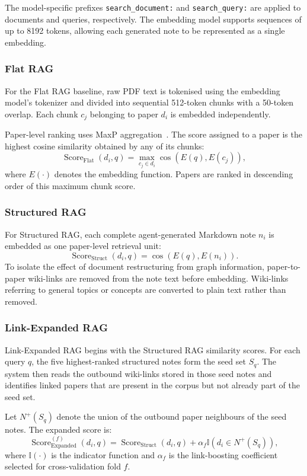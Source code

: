 \documentclass[runningheads]{llncs}
\begin{document}
The model-specific prefixes \texttt{search\_document:} and \texttt{search\_query:} are applied to documents and queries, respectively. The embedding model supports sequences of up to 8192 tokens, allowing each generated note to be represented as a single embedding.

\subsubsection{Flat RAG}
For the Flat RAG baseline, raw PDF text is tokenised using the embedding model's tokenizer and divided into sequential 512-token chunks with a 50-token overlap. Each chunk \(c_j\) belonging to paper \(d_i\) is embedded independently.

Paper-level ranking uses MaxP aggregation~\cite{dai2019deeper}. The score assigned to a paper is the highest cosine similarity obtained by any of its chunks:
\[
\operatorname{Score}_{\mathrm{Flat}}(d_i,q)
=
\max_{c_j \in d_i}
\cos\left(E(q),E(c_j)\right),
\]
where \(E(\cdot)\) denotes the embedding function. Papers are ranked in descending order of this maximum chunk score.

\subsubsection{Structured RAG}
For Structured RAG, each complete agent-generated Markdown note \(n_i\) is embedded as one paper-level retrieval unit:
\[
\operatorname{Score}_{\mathrm{Struct}}(d_i,q)
=
\cos\left(E(q),E(n_i)\right).
\]
To isolate the effect of document restructuring from graph information, paper-to-paper wiki-links are removed from the note text before embedding. Wiki-links referring to general topics or concepts are converted to plain text rather than removed.

\subsubsection{Link-Expanded RAG}
Link-Expanded RAG begins with the Structured RAG similarity scores. For each query \(q\), the five highest-ranked structured notes form the seed set \(S_q\). The system then reads the outbound wiki-links stored in those seed notes and identifies linked papers that are present in the corpus but not already part of the seed set.

Let \(N^{+}(S_q)\) denote the union of the outbound paper neighbours of the seed notes. The expanded score is:
\[
\operatorname{Score}_{\mathrm{Expanded}}^{(f)}(d_i,q)
=
\operatorname{Score}_{\mathrm{Struct}}(d_i,q)
+
\alpha_f
\mathbb{I}\left(d_i \in N^{+}(S_q)\right),
\]
where \(\mathbb{I}(\cdot)\) is the indicator function and \(\alpha_f\) is the link-boosting coefficient selected for cross-validation fold \(f\).
\end{document}
